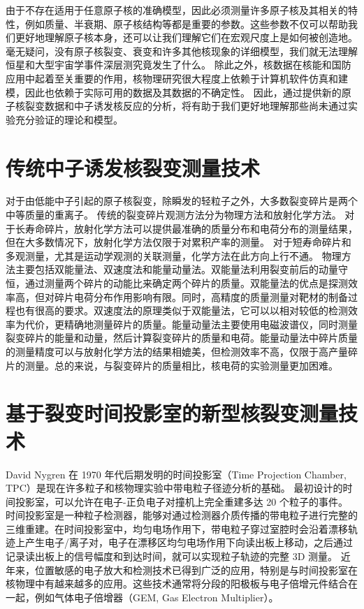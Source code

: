 \documentclass[AutoFakeBold]{LZUThesis}
\begin{document}
由于不存在适用于任意原子核的准确模型，因此必须测量许多原子核及其相关的特性，例如质量、半衰期、原子核结构等都是重要的参数。这些参数不仅可以帮助我们更好地理解原子核本身，还可以让我们理解它们在宏观尺度上是如何被创造地。毫无疑问，没有原子核裂变、衰变和许多其他核现象的详细模型，我们就无法理解恒星和大型宇宙学事件深层测究竟发生了什么。
除此之外，核数据在核能和国防应用中起着至关重要的作用，核物理研究很大程度上依赖于计算机软件仿真和建模，因此也依赖于实际可用的数据及其数据的不确定性。
因此，通过提供新的原子核裂变数据和中子诱发核反应的分析，将有助于我们更好地理解那些尚未通过实验充分验证的理论和模型\cite{bohr1939mechanism}。





\section{传统中子诱发核裂变测量技术}
对于由低能中子引起的原子核裂变，除瞬发的轻粒子之外，大多数裂变碎片是两个中等质量的重离子。
传统的裂变碎片观测方法分为物理方法和放射化学方法。
对于长寿命碎片，放射化学方法可以提供最准确的质量分布和电荷分布的测量结果，但在大多数情况下，放射化学方法仅限于对累积产率的测量。
对于短寿命碎片和多观测量，尤其是运动学观测的关联测量，化学方法在此方向上行不通。
物理方法主要包括双能量法、双速度法和能量动量法。双能量法利用裂变前后的动量守恒，通过测量两个碎片的动能比来确定两个碎片的质量。双能量法的优点是探测效率高，但对碎片电荷分布作用影响有限。同时，高精度的质量测量对靶材的制备过程也有很高的要求。双速度法的原理类似于双能量法，它可以以相对较低的检测效率为代价，更精确地测量碎片的质量。能量动量法主要使用电磁波谱仪，同时测量裂变碎片的能量和动量，然后计算裂变碎片的质量和电荷。能量动量法中碎片质量的测量精度可以与放射化学方法的结果相媲美，但检测效率不高，仅限于高产量碎片的测量。总的来说，与裂变碎片的质量相比，核电荷的实验测量更加困难。






\section{基于裂变时间投影室的新型核裂变测量技术}
David Nygren 在 1970 年代后期发明的时间投影室（Time Projection Chamber, TPC）是现在许多粒子和核物理实验中带电粒子径迹分析的基础\cite{nygren1978time}。
最初设计的时间投影室，可以允许在电子-正负电子对撞机上完全重建多达 20 个粒子的事件。
时间投影室是一种粒子检测器，能够对通过检测器介质传播的带电粒子进行完整的三维重建。在时间投影室中，均匀电场作用下，带电粒子穿过室腔时会沿着漂移轨迹上产生电子/离子对，电子在漂移区均匀电场作用下向读出板上移动，之后通过记录读出板上的信号幅度和到达时间，就可以实现粒子轨迹的完整 3D 测量。
近年来，位置敏感的电子放大和检测技术已得到广泛的应用，特别是与时间投影室在核物理中有越来越多的应用。这些技术通常将分段的阳极板与电子倍增元件结合在一起，例如气体电子倍增器（GEM, Gas Electron Multiplier）\cite{fenker2008bonus}。
\end{document}
